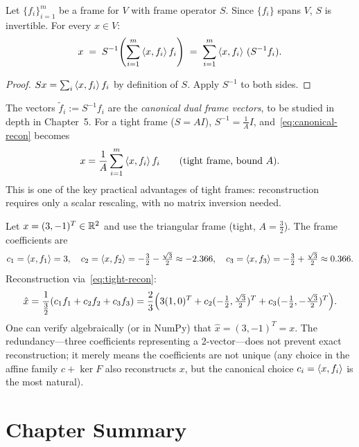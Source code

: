 \begin{proposition}
\label{prop:reconstruction}
Let $\{f_i\}_{i=1}^m$ be a frame for $V$ with frame operator $S$. Since
$\{f_i\}$ spans $V$, $S$ is invertible. For every $x\in V$:
\begin{equation}
\label{eq:canonical-recon}
  x \;=\; S^{-1}\!\left(\sum_{i=1}^m \left\langle x, f_i \right\rangle f_i\right)
    \;=\; \sum_{i=1}^m \left\langle x, f_i \right\rangle\,(S^{-1}f_i).
\end{equation}
\end{proposition}

\begin{proof}
$Sx = \sum_i\left\langle x, f_i \right\rangle f_i$ by definition of $S$. Apply $S^{-1}$ to
both sides.
\end{proof}

The vectors $\tilde f_i := S^{-1}f_i$ are the \emph{canonical dual frame
vectors}, to be studied in depth in Chapter~5. For a tight frame
($S=AI$), $S^{-1}=\tfrac1A I$, and~\eqref{eq:canonical-recon} becomes
\begin{equation}
\label{eq:tight-recon}
  x = \frac{1}{A}\sum_{i=1}^m \left\langle x, f_i \right\rangle f_i
  \qquad (\text{tight frame, bound }A).
\end{equation}
This is one of the key practical advantages of tight frames: reconstruction
requires only a scalar rescaling, with no matrix inversion needed.

\begin{examplebox}[title={Example 3.7: Reconstruction with the triangular frame}]
\label{ex:reconstruction-triangle}
Let $x=(3,-1)^T\in\mathbb{R}^2$ and use the triangular frame (tight, $A=\tfrac32$).
The frame coefficients are
\[
  c_1 = \left\langle x, f_1 \right\rangle = 3,\quad
  c_2 = \left\langle x, f_2 \right\rangle = -\tfrac32 - \tfrac{\sqrt3}{2}\approx -2.366,\quad
  c_3 = \left\langle x, f_3 \right\rangle = -\tfrac32 + \tfrac{\sqrt3}{2}\approx 0.366.
\]
Reconstruction via~\eqref{eq:tight-recon}:
\[
  \hat x = \frac{1}{\tfrac32}(c_1 f_1 + c_2 f_2 + c_3 f_3)
  = \frac23\Bigl(3(1,0)^T + c_2(-\tfrac12,\tfrac{\sqrt3}{2})^T
    + c_3(-\tfrac12,-\tfrac{\sqrt3}{2})^T\Bigr).
\]
One can verify algebraically (or in NumPy) that $\hat x = (3,-1)^T = x$.
The redundancy---three coefficients representing a 2-vector---does not
prevent exact reconstruction; it merely means the coefficients are not
unique (any choice in the affine family $c + \ker F$ also reconstructs
$x$, but the canonical choice $c_i=\left\langle x, f_i \right\rangle$ is the most natural).
\end{examplebox}

\section{Chapter Summary}
\label{sec:summary-ch3}

